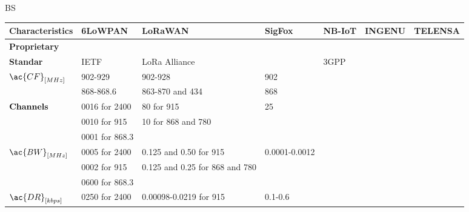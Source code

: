 \ac{BS}


\begin{table}[!ht]
\scriptsize
	\begin{tabulary}{\columnwidth}{L|L|L|L|L|L|L}
	\bf{Characteristics}               & \bf{6LoWPAN}   & \bf{LoRaWAN}                    & \bf{SigFox}   & \bf{NB-IoT} & \textbf{INGENU} & \textbf{TELENSA}\\\hline
	\bf{Proprietary}                   &                &                                 & \ok           &             &                 &                 \\\hline
	\bf{Standar}                       & IETF           & LoRa Alliance                   &               & 3GPP        &                 &                 \\\hline
	 & 902-929        & 902-928                         & 902           &             &                 &                 \\
	\                                  & 868-868.6      & 863-870 and 434                 & 868           &             &                 &                 \\\hline
	  & 0016 for 2400  & 80             for 915          & 25            &             &                 &                 \\
	\                                  & 0010 for 915   & 10             for 868 and 780  &               &             &                 &                 \\
	\                                  & 0001 for 868.3 &                                 &               &             &                 &                 \\\hline
	 & 0005 for 2400  & 0.125 and 0.50 for 915          & 0.0001-0.0012 &             &                 &                 \\
	\                                  & 0002 for 915   & 0.125 and 0.25 for 868 and 780  &               &             &                 &                 \\
	\                                  & 0600 for 868.3 &                                 &               &             &                 &                 \\\hline
	& 0250 for 2400  & 0.00098-0.0219 for 915          & 0.1-0.6       &             &                 &                 \\

\end{tabulary}
\end{table}
